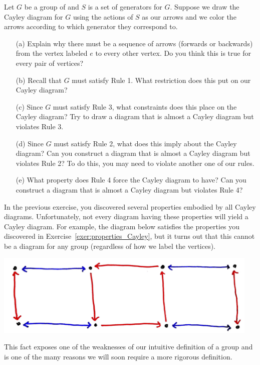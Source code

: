 \begin{exercise}\label{exer:properties_Cayley}
Let $G$ be a group of and $S$ is a set of generators for $G$. Suppose we draw the Cayley diagram for $G$ using the actions of $S$ as our arrows and we color the arrows according to which generator they correspond to.  
\begin{enumerate}
\item[(a)] Explain why there must be a sequence of arrows (forwards or backwards) from the vertex labeled $e$ to every other vertex.  Do you think this is true for every pair of vertices?
\item[(b)] Recall that $G$ must satisfy Rule 1.  What restriction does this put on our Cayley diagram?
\item[(c)] Since $G$ must satisfy Rule 3, what constraints does this place on the Cayley diagram?  Try to draw a diagram that is almost a Cayley diagram but violates Rule 3.
\item[(d)] Since $G$ must satisfy Rule 2, what does this imply about the Cayley diagram?  Can you construct a diagram that is almost a Cayley diagram but violates Rule 2?  To do this, you may need to violate another one of our rules.
\item[(e)] What property does Rule 4 force the Cayley diagram to have?  Can you construct a diagram that is almost a Cayley diagram but violates Rule 4? 
\end{enumerate}
\end{exercise}

In the previous exercise, you discovered several properties embodied by all Cayley diagrams. Unfortunately, not every diagram having these properties will yield a Cayley diagram.  For example, the diagram below satisfies the properties you discovered in Exercise~\ref{exer:properties_Cayley}, but it turns out that this cannot be a diagram for any group (regardless of how we label the vertices).

\begin{center}
\includegraphics[width=5in]{nonregular.png}
\end{center}

This fact exposes one of the weaknesses of our intuitive definition of a group and is one of the many reasons we will soon require a more rigorous definition.